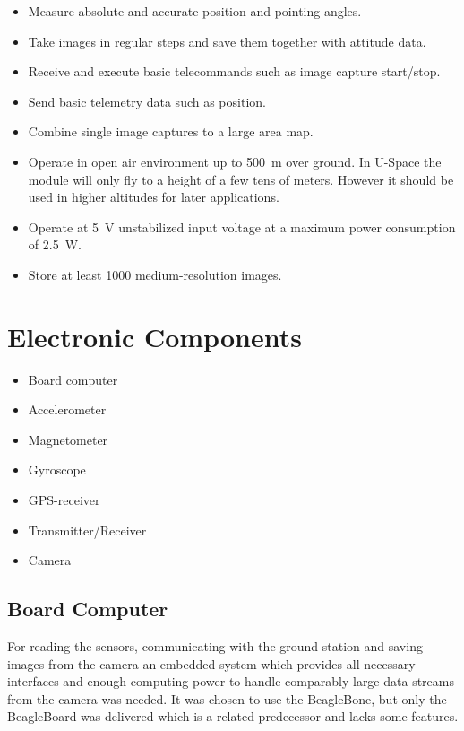 \begin{itemize}
\item Measure absolute and accurate position and pointing angles.
\item Take images in regular steps and save them together with attitude data.
\item Receive and execute basic telecommands such as image capture start/stop.
\item Send basic telemetry data such as position.
\item Combine single image captures to a large area map.
\item Operate in open air environment up to 500~m over ground. In U-Space the
module will only fly to a height of a few tens of meters. However it should be
used in higher altitudes for later applications.
\item Operate at 5~V unstabilized input voltage at a maximum power consumption
of 2.5~W.
\item Store at least 1000 medium-resolution images.
\end{itemize}


\section{Electronic Components}

\begin{itemize}
 \item Board computer
 \item Accelerometer
 \item Magnetometer
 \item Gyroscope
 \item GPS-receiver
 \item Transmitter/Receiver
 \item Camera
\end{itemize}

\subsection*{Board Computer}

For reading the sensors, communicating with the ground station and saving
images from the camera an embedded system which provides all necessary
interfaces and enough computing power to handle comparably large data streams
from the camera was needed. It was chosen to use the BeagleBone, but only the
BeagleBoard was delivered which is a related predecessor and lacks some
features.

